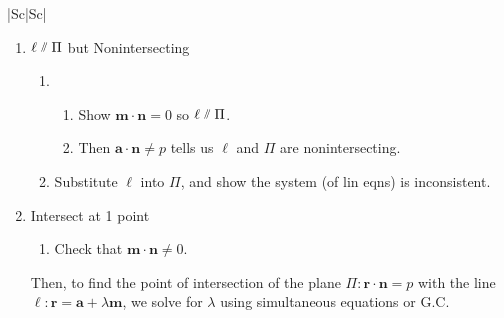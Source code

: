 \documentclass[oneside]{book}
\begin{document}
\begin{longtable}{|Sc|Sc|}
{\begin{minipage}{\textwidth}
\begin{enumerate}
\begin{enumerate}[label=M\arabic*:]
\begin{enumerate}
      \end{enumerate}
      \item Substitute \(\ell\) into \(\Pi\) and show the system (of lin eqns) is consistent for all \(\lambda\).
    \end{enumerate}
    \item \(\ell \newparallel \Pi\) but Nonintersecting
    \begin{enumerate}[label=M\arabic*:]
      \item 
      \begin{enumerate}
        \item Show \(\mathbf{m}\cdot \mathbf{n}=0\) so \(\ell \newparallel \Pi\).
        \item Then \(\mathbf{a}\cdot \mathbf{n} \neq p\) tells us \(\ell\) and \(\Pi\) are nonintersecting.
      \end{enumerate}
      \item Substitute \(\ell\) into \(\Pi\), and show the system (of lin eqns) is inconsistent.
    \end{enumerate} 
    \item Intersect at 1 point
    \begin{enumerate}[label=M\arabic*:]
      \item Check that \(\mathbf{m}\cdot \mathbf{n} \neq 0\).
    \end{enumerate}
    Then, to find the point of intersection of the plane \(\Pi\colon \mathbf{r}\cdot \mathbf{n}=p\) with the line \(\ell\colon \mathbf{r}=\mathbf{a}+\lambda \mathbf{m}\),
    we solve for \(\lambda\) using simultaneous equations or G.C.
  \end{enumerate}
\end{minipage}}\\
\hline
{}\\
\hline
{}\\

\end{longtable}
\end{document}
